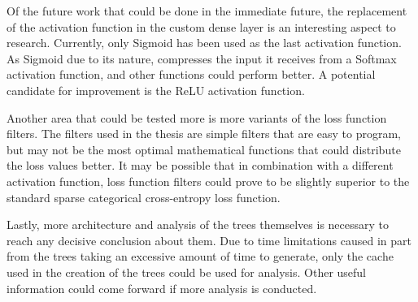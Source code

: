 Of the future work that could be done in the immediate future, the replacement of the activation function in the custom dense layer is an interesting aspect to research.
Currently, only Sigmoid has been used as the last activation function.
As Sigmoid due to its nature, compresses the input it receives from a Softmax activation function, and other functions could perform better.
A potential candidate for improvement is the ReLU activation function.

Another area that could be tested more is more variants of the loss function filters.
The filters used in the thesis are simple filters that are easy to program, but may not be the most optimal mathematical functions that could distribute the loss values better.
It may be possible that in combination with a different activation function, loss function filters could prove to be slightly superior to the standard sparse categorical cross-entropy loss function.

Lastly, more architecture and analysis of the trees themselves is necessary to reach any decisive conclusion about them.
Due to time limitations caused in part from the trees taking an excessive amount of time to generate, only the cache used in the creation of the trees could be used for analysis.
Other useful information could come forward if more analysis is conducted.

